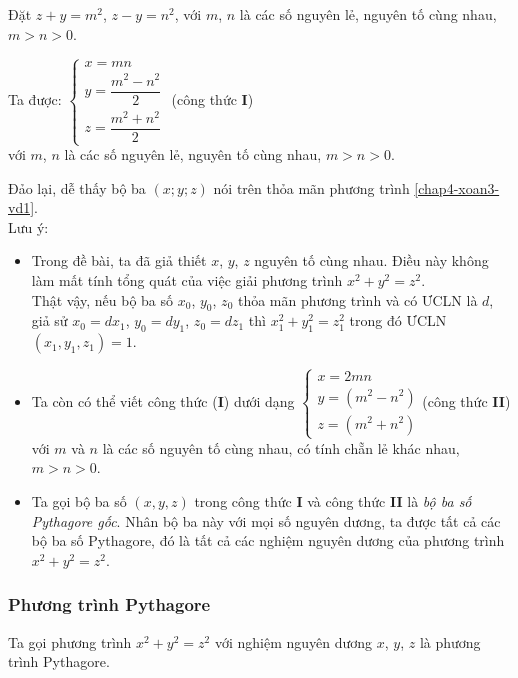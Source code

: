 \begin{vd}
{\begin{enumerate}[a)]
        	Đặt $z+y=m^2$, $z-y=n^2$, với $m$, $n$ là các số nguyên lẻ, nguyên tố cùng nhau, $m>n>0$.
        	
        	Ta được:
        	$\begin{cases}
        		x=mn\\
        		y=\dfrac{m^2-n^2}{2}\\
        		z=\dfrac{m^2+n^2}{2}
        	\end{cases}$
        	(công thức \textbf{I})\\
        	với $m$, $n$ là các số nguyên lẻ, nguyên tố cùng nhau, $m>n>0$.
        	
        	Đảo lại, dễ thấy bộ ba $(x;y;z)$ nói trên thỏa mãn phương trình \eqref{chap4-xoan3-vd1}.\\
        	Lưu ý:
        	\begin{itemize}
        		\item Trong đề bài, ta đã giả thiết $x$, $y$, $z$ nguyên tố cùng nhau. Điều này không làm mất tính tổng quát của việc giải phương trình $x^2+y^2=z^2$. \\
        		Thật vậy, nếu bộ ba số $x_0$, $y_0$, $z_0$ thỏa mãn phương trình và có ƯCLN là $d$, giả sử $x_0=dx_1$, $y_0=dy_1$, $z_0=dz_1$ thì $x_1^2+y_1^2=z_1^2$ trong đó ƯCLN $(x_1,y_1,z_1)=1$.
        		\item Ta còn có thể viết công thức (\textbf{I}) dưới dạng $\begin{cases}
        		x=2mn\\
        		y=(m^2-n^2)\\
        		z=(m^2+n^2)
        		\end{cases}$(công thức \textbf{II})\\
        		với $m$ và $n$ là các số nguyên tố cùng nhau, có tính chẵn lẻ khác nhau, $m>n>0$.
        		\item Ta gọi bộ ba số $(x,y,z)$ trong công thức \textbf{I} và công thức \textbf{II} là \textit{bộ ba số Pythagore gốc}. Nhân bộ ba này với mọi số nguyên dương, ta được tất cả các bộ ba số Pythagore, đó là tất cả các nghiệm nguyên dương của phương trình $x^2+y^2=z^2$.
        	\end{itemize}
        \end{enumerate}
    }
\end{vd}
\subsubsection{Phương trình Pythagore}
Ta gọi phương trình $x^2+y^2=z^2$ với nghiệm nguyên dương $x$, $y$, $z$ là phương trình Pythagore.


